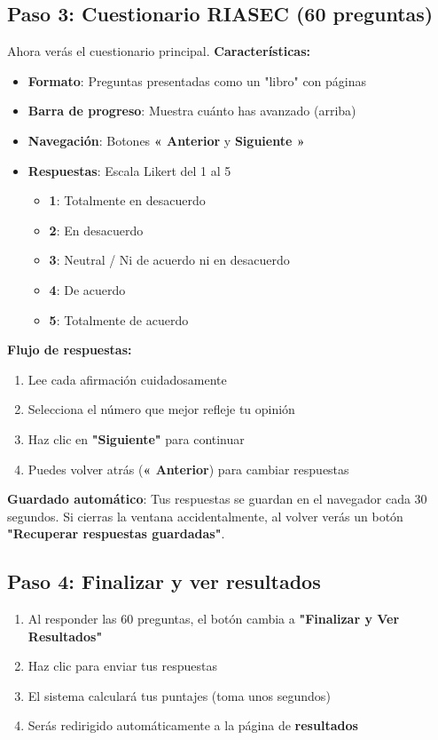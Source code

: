 \documentclass[12pt, a4paper]{report}
\begin{document}
\subsection{Paso 3: Cuestionario RIASEC (60 preguntas)}
Ahora verás el cuestionario principal. \textbf{Características:}
\begin{itemize}
    \item \textbf{Formato}: Preguntas presentadas como un "libro" con páginas
    \item \textbf{Barra de progreso}: Muestra cuánto has avanzado (arriba)
    \item \textbf{Navegación}: Botones \textbf{« Anterior} y \textbf{Siguiente »}
    \item \textbf{Respuestas}: Escala Likert del 1 al 5
    \begin{itemize}
        \item \textbf{1}: Totalmente en desacuerdo
        \item \textbf{2}: En desacuerdo
        \item \textbf{3}: Neutral / Ni de acuerdo ni en desacuerdo
        \item \textbf{4}: De acuerdo
        \item \textbf{5}: Totalmente de acuerdo
    \end{itemize}
\end{itemize}

\textbf{Flujo de respuestas:}
\begin{enumerate}
    \item Lee cada afirmación cuidadosamente
    \item Selecciona el número que mejor refleje tu opinión
    \item Haz clic en \textbf{"Siguiente"} para continuar
    \item Puedes volver atrás (\textbf{« Anterior}) para cambiar respuestas
\end{enumerate}

\textbf{Guardado automático}: Tus respuestas se guardan en el navegador cada 30 segundos. Si cierras la ventana accidentalmente, al volver verás un botón \textbf{"Recuperar respuestas guardadas"}.

\subsection{Paso 4: Finalizar y ver resultados}
\begin{enumerate}
    \item Al responder las 60 preguntas, el botón cambia a \textbf{"Finalizar y Ver Resultados"}
    \item Haz clic para enviar tus respuestas
    \item El sistema calculará tus puntajes (toma unos segundos)
    \item Serás redirigido automáticamente a la página de \textbf{resultados}
\end{enumerate}
\end{document}
